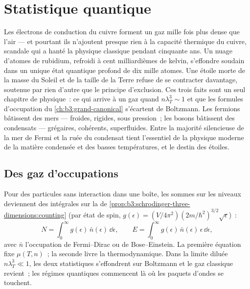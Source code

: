 \chapter{Statistique quantique}\label{ch:b3:quantum-statistics}

Les électrons de conduction du cuivre forment un gaz mille fois plus
dense que l'air --- et pourtant ils n'ajoutent presque rien à la
capacité thermique du cuivre, scandale qui a hanté la physique
classique pendant cinquante ans. Un nuage d'atomes de rubidium,
refroidi à cent milliardièmes de kelvin, s'effondre soudain dans un
unique état quantique profond de dix mille atomes. Une étoile morte
de la masse du Soleil et de la taille de la Terre refuse de se
contracter davantage, soutenue par rien d'autre que le principe
d'exclusion. Ces trois faits sont un seul chapitre de physique~: ce
qui arrive à un gaz quand $n\lambda_T^3 \sim 1$ et que les formules
d'occupation du \cref{ch:b3:grand-canonical} s'écartent de
Boltzmann. Les fermions bâtissent des mers --- froides, rigides,
sous pression~; les bosons bâtissent des condensats --- grégaires,
cohérents, superfluides. Entre la majorité silencieuse de la mer de
Fermi et la ruée du condensat tient l'essentiel de la physique
moderne de la matière condensée et des basses températures, et le
destin des étoiles.

\section{Des gaz d'occupations}

\begin{proposition}\label{prop:b3:quantum-statistics:machinery}
Pour des particules sans interaction dans une boîte, les sommes sur
les niveaux deviennent des intégrales sur la  de
\cref{prop:b3:schrodinger-three-dimensions:counting} (par état de
spin, $g(\epsilon) = (V/4\pi^2)(2m/\hbar^2)^{3/2}\sqrt\epsilon$)~:
\[
N = \int_0^\infty g(\epsilon)\,\bar n(\epsilon)\,\dd\epsilon ,
\qquad
E = \int_0^\infty g(\epsilon)\,\bar n(\epsilon)\,\epsilon\,
\dd\epsilon ,
\]
avec $\bar n$ l'occupation de Fermi--Dirac ou de Bose--Einstein. La
première équation fixe $\mu(T, n)$~; la seconde livre la
thermodynamique. Dans la limite diluée $n\lambda_T^3 \ll 1$, les deux
statistiques s'effondrent sur Boltzmann et le gaz classique revient~;
les régimes quantiques commencent là où les paquets d'ondes se
touchent.
\end{proposition}
\admitted

